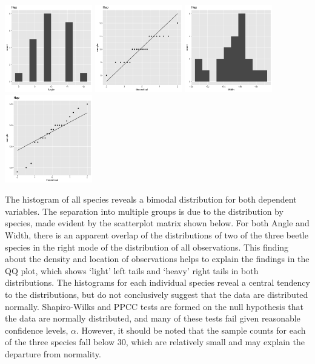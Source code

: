 \begin{center}
	\includegraphics[width=1.5in]{1_Hep_a_hist.png}
	\includegraphics[width=1.5in]{1_Hep_a_qq.png}
	\includegraphics[width=1.5in]{1_Hep_w_hist.png}
	\includegraphics[width=1.5in]{1_Hep_w_qq.png}
\end{center}

	The histogram of all species reveals a bimodal distribution for both dependent variables. The separation into multiple groups is due to the distribution by species, made evident by the scatterplot matrix shown below. For both Angle and Width, there is an apparent overlap of the distributions of two of the three beetle species in the right mode of the distribution of all observations. This finding about the density and location of observations helps to explain the findings in the QQ plot, which shows `light' left tails and `heavy' right tails in both distributions. The histograms for each individual species reveal a central tendency to the distributions, but do not conclusively suggest that the data are distributed normally. Shapiro-Wilks and PPCC tests are formed on the null hypothesis that the data are normally distributed, and many of these tests fail given reasonable confidence levels, $\alpha$. However, it should be noted that the sample counts for each of the three species fall below $30$, which are relatively small and may explain the departure from normality.

